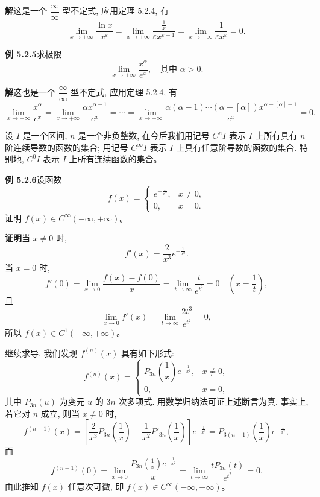 \documentclass[UTF8, 12pt, fontset=fandol, oneside]{ctexart}
\begin{document}
\noindent\textbf{解}\quad 这是一个 $\dfrac\infty\infty$ 型不定式, 应用定理 5.2.4, 有
\[
  \lim_{x\to+\infty}\frac{\ln x}{x^\varepsilon}
  =
  \lim_{x\to+\infty}\frac{\frac1x}{\varepsilon x^{\varepsilon-1}}
  =
  \lim_{x\to+\infty}\frac1{\varepsilon x^\varepsilon}=0.
\]

\noindent\textbf{例 5.2.5}\quad 求极限
\[
  \lim_{x\to+\infty}\frac{x^\alpha}{e^x},\quad \text{其中 }\alpha>0.
\]

\noindent\textbf{解}\quad 这也是一个 $\dfrac\infty\infty$ 型不定式, 应用定理 5.2.4, 有
\[
  \lim_{x\to+\infty}\frac{x^\alpha}{e^x}
  =
  \lim_{x\to+\infty}\frac{\alpha x^{\alpha-1}}{e^x}
  =
  \cdots
  =
  \lim_{x\to+\infty}
  \frac{\alpha(\alpha-1)\cdots(\alpha-[\alpha])x^{\alpha-[\alpha]-1}}{e^x}
  =
  0.
\]

设 $I$ 是一个区间, $n$ 是一个非负整数, 在今后我们用记号 $C^nI$ 表示 $I$ 上所有具有 $n$ 阶连续导数的函数的集合; 用记号 $C^\infty I$ 表示 $I$ 上具有任意阶导数的函数的集合. 特别地, $C^0I$ 表示 $I$ 上所有连续函数的集合。

\noindent\textbf{例 5.2.6}\quad 设函数
\[
  f(x)=
  \begin{cases}
    e^{-\frac1{x^2}}, & x\ne0,\\
    0, & x=0.
  \end{cases}
\]
证明 $f(x)\in C^\infty(-\infty,+\infty)$。

\noindent\textbf{证明}\quad 当 $x\ne0$ 时,
\[
  f'(x)=\frac2{x^3}e^{-\frac1{x^2}}.
\]
当 $x=0$ 时,
\[
  f'(0)=\lim_{x\to0}\frac{f(x)-f(0)}x
  =
  \lim_{t\to\infty}\frac{t}{e^{t^2}}
  =
  0\quad \left(x=\frac1t\right),
\]
且
\[
  \lim_{x\to0}f'(x)
  =
  \lim_{t\to\infty}\frac{2t^3}{e^{t^2}}
  =
  0,
\]
所以 $f(x)\in C^1(-\infty,+\infty)$。

继续求导, 我们发现 $f^{(n)}(x)$ 具有如下形式:
\[
  f^{(n)}(x)=
  \begin{cases}
    P_{3n}\left(\dfrac1x\right)e^{-\frac1{x^2}}, & x\ne0,\\
    0, & x=0,
  \end{cases}
\]
其中 $P_{3n}(u)$ 为变元 $u$ 的 $3n$ 次多项式. 用数学归纳法可证上述断言为真. 事实上, 若它对 $n$ 成立, 则当 $x\ne0$ 时,
\[
  f^{(n+1)}(x)
  =
  \left[
    \frac2{x^3}P_{3n}\left(\frac1x\right)
    -
    \frac1{x^2}P'_{3n}\left(\frac1x\right)
  \right]e^{-\frac1{x^2}}
  =
  P_{3(n+1)}\left(\frac1x\right)e^{-\frac1{x^2}},
\]
而
\[
  f^{(n+1)}(0)
  =
  \lim_{x\to0}
  \frac{P_{3n}\left(\frac1x\right)e^{-\frac1{x^2}}}{x}
  =
  \lim_{t\to\infty}\frac{tP_{3n}(t)}{e^{t^2}}
  =
  0.
\]
由此推知 $f(x)$ 任意次可微, 即 $f(x)\in C^\infty(-\infty,+\infty)$。
\end{document}
